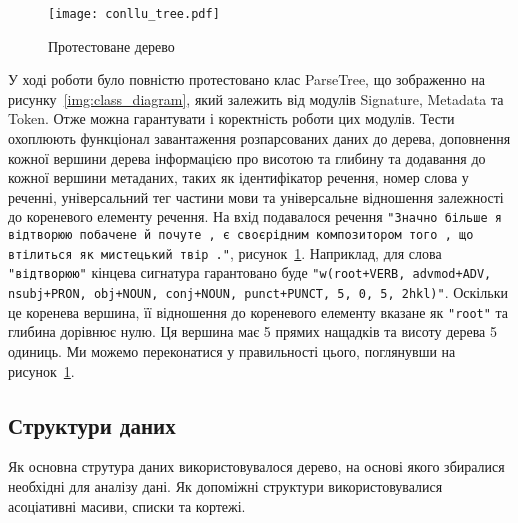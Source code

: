 \begin{figure}[ht]
  \begin{center}
    \texttt{[image: conllu\_tree.pdf]}
  \end{center}
  \caption{Протестоване дерево}
  \label{img:tested_conllu_tree}
\end{figure}

У ході роботи було повністю протестовано клас ParseTree, що зображенно на рисунку~\ref{img:class_diagram}, який залежить
від модулів Signature, Metadata та Token. Отже можна гарантувати і коректність роботи цих
модулів. Тести охоплюють функціонал завантаження розпарсованих даних до дерева, доповнення
кожної вершини дерева інформацією про висотою та глибину та додавання до кожної
вершини метаданих, таких як ідентифікатор речення, номер слова у реченні, універсальний тег
частини мови та універсальне відношення залежності до кореневого елементу речення.
На вхід подавалося речення \texttt{"Значно більше я відтворюю побачене й почуте , є своєрідним
композитором того , що втілиться як мистецький твір ."}, рисунок~\ref{img:tested_conllu_tree}.
Наприклад, для слова \texttt{"відтворюю"} кінцева сигнатура гарантовано буде
\texttt{"w(root+VERB, advmod+ADV, nsubj+PRON, obj+NOUN, conj+NOUN, punct+PUNCT, 5, 0, 5, 2hkl)"}.
Оскільки це коренева вершина, її відношення до кореневого елементу вказане як \texttt{"root"}
та глибина дорівнює нулю. Ця вершина має 5 прямих нащадків та висоту дерева 5 одиниць. Ми можемо
переконатися у правильності цього, поглянувши на рисунок~\ref{img:tested_conllu_tree}.

\subsection{Структури даних}
Як основна струтура даних використовувалося дерево, на основі якого збиралися необхідні
для аналізу дані. Як допоміжні структури використовувалися асоціативні масиви, списки та
кортежі.

